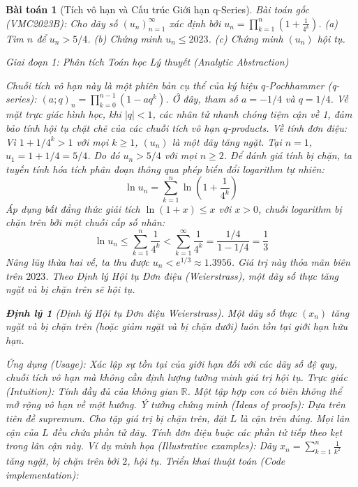 \documentclass{article}
\newtheorem{baitoan}{Bài toán}
\newtheorem{dinhly}{Định lý}
\begin{document}
\begin{baitoan}[Tích vô hạn và Cấu trúc Giới hạn q-Series]
 \emph{Bài toán gốc (VMC2023B):} 
 Cho dãy số $(u_n)_{n=1}^\infty$ xác định bởi $u_n = \prod_{k=1}^n \left(1 + \frac{1}{4^k}\right)$. (a) Tìm $n$ để $u_n > 5/4$. (b) Chứng minh $u_n\le2023$. (c) Chứng minh $(u_n)$ hội tụ.

\vspace{0.5em}\noindent\emph{Giai đoạn 1: Phân tích Toán học Lý thuyết (Analytic Abstraction)}
 
 Chuỗi tích vô hạn này là một phiên bản cụ thể của ký hiệu $q$-Pochhammer (q-series): $(a; q)_n = \prod_{k=0}^{n-1} (1 - a q^k)$.
 Ở đây, tham số $a = -1/4$ và $q = 1/4$. Về mặt trực giác hình học, khi $|q| < 1$, các nhân tử nhanh chóng tiệm cận về 1, đảm bảo tính hội tụ chặt chẽ của các chuỗi tích vô hạn $q$-products.
 Về tính đơn điệu: Vì $1 + 1/4^k > 1$ với mọi $k \ge 1$, $(u_n)$ là một dãy tăng ngặt. Tại $n=1$, $u_1 = 1 + 1/4 = 5/4$. Do đó $u_n > 5/4$ với mọi $n \ge 2$.
 Để đánh giá tính bị chặn, ta tuyến tính hóa tích phân đoạn thông qua phép biến đổi logarithm tự nhiên:
 \begin{equation}
 \ln u_n = \sum_{k=1}^n \ln\left(1 + \frac{1}{4^k}\right)
 \end{equation}
 Áp dụng bất đẳng thức giải tích $\ln(1+x) \le x$ với $x > 0$, chuỗi logarithm bị chặn trên bởi một chuỗi cấp số nhân:
 \begin{equation}
 \ln u_n \le \sum_{k=1}^n \frac{1}{4^k} < \sum_{k=1}^\infty \frac{1}{4^k} = \frac{1/4}{1 - 1/4} = \frac{1}{3}
 \end{equation}
 Nâng lũy thừa hai vế, ta thu được $u_n < e^{1/3} \approx 1.3956$. Giá trị này thỏa mãn biên trên $2023$. Theo Định lý Hội tụ Đơn điệu (Weierstrass), một dãy số thực tăng ngặt và bị chặn trên sẽ hội tụ.

\begin{dinhly}[Định lý Hội tụ Đơn điệu Weierstrass]
Một dãy số thực $(x_n)$ tăng ngặt và bị chặn trên (hoặc giảm ngặt và bị chặn dưới) luôn tồn tại giới hạn hữu hạn.
\end{dinhly}
\emph{Ứng dụng (Usage):} Xác lập sự tồn tại của giới hạn đối với các dãy số đệ quy, chuỗi tích vô hạn mà không cần định lượng tường minh giá trị hội tụ.
\emph{Trực giác (Intuition):} Tính đầy đủ của không gian $\mathbb{R}$. Một tập hợp con có biên không thể mở rộng vô hạn về một hướng.
\emph{Ý tưởng chứng minh (Ideas of proofs):} Dựa trên tiên đề supremum. Cho tập giá trị bị chặn trên, đặt $L$ là cận trên đúng. Mọi lân cận của $L$ đều chứa phần tử dãy. Tính đơn điệu buộc các phần tử tiếp theo kẹt trong lân cận này.
\emph{Ví dụ minh họa (Illustrative examples):} Dãy $x_n = \sum_{k=1}^n \frac{1}{k^2}$ tăng ngặt, bị chặn trên bởi $2$, hội tụ.
\emph{Triển khai thuật toán (Code implementation):}




\end{baitoan}
\end{document}
